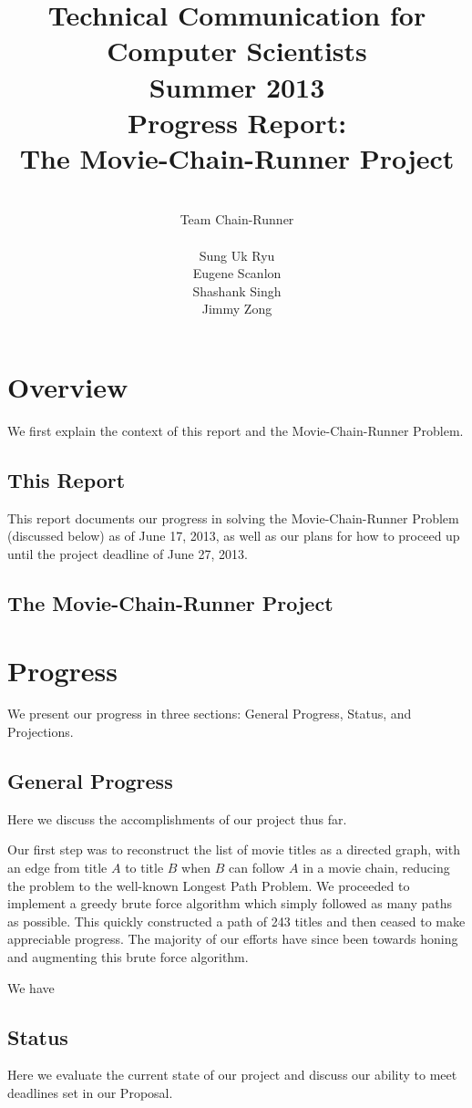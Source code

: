 \documentclass[11pt,english]{article}
\title{
{\normalsize \bf Technical Communication for Computer Scientists\\
Summer 2013}\\
\vspace{4cm}
{\bf Progress Report:\\The Movie-Chain-Runner Project}}
\author{
\\Team Chain-Runner \\\\
Sung Uk Ryu\\
Eugene Scanlon\\
Shashank Singh\\
Jimmy Zong
}
\begin{document}


\tableofcontents

\newpage
{} %
\section{Overview}
We first explain the context of this report and the Movie-Chain-Runner Problem.
\subsection{This Report}
This report documents our progress in solving the Movie-Chain-Runner Problem
(discussed below) as of June 17, 2013, as well as our plans for how to proceed
up until the project deadline of June 27, 2013.

\subsection{The Movie-Chain-Runner Project}

\section{Progress}
We present our progress in three sections: General Progress, Status, and
Projections.

\subsection{General Progress}
Here we discuss the accomplishments of our project thus far.

Our first step was to reconstruct the list of movie titles as a directed graph,
with an edge from title $A$ to title $B$ when $B$ can follow $A$ in a movie
chain, reducing the problem to the well-known Longest Path Problem.
We proceeded to implement a greedy brute force algorithm which simply followed
as many paths as possible. This quickly constructed a path of 243 titles and
then ceased to make appreciable progress. The majority of our efforts have
since been towards honing and augmenting this brute force algorithm.

We have 

\subsection{Status}
Here we evaluate the current state of our project and discuss our ability to
meet deadlines set in our Proposal.
\end{document}
